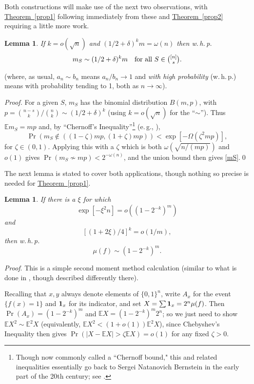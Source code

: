 \documentclass[11pt]{article}
\numberwithin{equation}{section}
\newtheorem{lemma}[theorem]{Lemma}
\theoremstyle{definition}
\theoremstyle{plain}
\newcommand{\eg}{e.\,g.}
\newcommand{\expref}[2]{\hyperref[#2]{#1~\ref{#2}}}
\newcommand{\one}[0]{{\bf 1}}
\newcommand{\beq}[1]{\begin{equation}\label{#1}}
\newcommand{\enq}[0]{\end{equation}}
\newcommand{\mn}[0]{\medskip\noindent}
\newcommand{\nin}[0]{\noindent}
\newcommand{\ra}[0]{\rightarrow}
\newcommand{\0}[0]{\emptyset}
\newcommand{\Cc}[0]{\tbinom}
\newcommand{\gd}[0]{\delta }
\newcommand{\go}[0]{\omega}
\newcommand{\gO}[0]{\Omega}
\newcommand{\gz}[0]{\zeta}
\begin{document}
Both constructions will make use of the next two
observations, with \expref{Theorem}{prop1}
following immediately from these and
\expref{Theorem}{prop2} requiring a little more work.
\begin{lemma}\label{mSlemma}
If $k=o(\sqrt{n})$ and $(1/2+\gd)^km=\go(n)$ then
w.\,h.\,p.
\beq{mS}
%
%
%
%
%
%
%
m_S \sim (1/2+\gd)^km ~~ \text{ for all } S\in \Cc{[n]}{s}. %
%
\enq
\end{lemma}
\nin
(where, as usual, $a_n\sim b_n$ means $a_n/b_n\ra 1 $
and
\emph{with high probability} (w.\,h.\,p.) means
with probability tending to 1, both as $n\ra\infty$).


\mn
\emph{Proof.}
For a given $S$, $m_S$ has the binomial distribution
$B(m,p)$, with $p = \binom{n-s}{k}/\binom{n}{k}\sim(1/2+\gd)^k$
(using $k=o(\sqrt{n})$ for the ``$\sim $'').
Thus
$\mathbb E  m_S=mp$ and,
by ``Chernoff's Inequality''\footnote{Though now commonly called a ``Chernoff bound," this and related inequalities essentially go back to
 Sergei Natanovich  %
Bernstein in the early
part of the 20th century; see \cite{Wiki}.}
%
%
%
%
%
%
(\eg, \cite[Theorem 2.1]{JLR}),
\begin{equation}   \label{eq:chernoff}
\Pr(m_S\not\in ((1-\gz)mp,(1+\gz)mp)) < \exp [-\gO(\gz^2mp)],
\end{equation}
for $\gz\in (0,1)$.
Applying this with a $\gz$ which is both
$\go(\sqrt{n/(mp)})$ and $o(1)$ gives
$\Pr(m_S\not\sim mp )< 2^{-\go(n)}$,
and the union bound then gives \eqref{mS}.\qed


\medskip
The next lemma is stated to cover
both applications, though nothing so precise
is needed for \expref{Theorem}{prop1}.

\begin{lemma}\label{muflemma}
If there is a $\xi$ for which
\beq{xi1}
\exp[-\xi^2n] = o((1-2^{-k})^m)
\enq
and
\beq{xi2}
[(1+2\xi)/4]^k=o(1/m),
\enq
then
w.\,h.\,p.
\beq{muf}
\mu(f) \sim (1-2^{-k})^m.
\enq
\end{lemma}


\mn
\emph{Proof}.
This is a simple second moment method calculation
(similar to %
what is %
done in \cite{AL}, though described
differently there).


Recalling that $x,y$ always denote elements of $\{0,1\}^n$,
write $A_x$ for the event $\{f(x)=1\}$ and $\one_x$
for its indicator,
and set $X=\sum \one_x=2^n\mu(f) $.
Then
$\Pr(A_x)= (1-2^{-k})^m$ and
$\mathbb E  X = (1-2^{-k})^m2^n$; so we just need to show
$
\mathbb E  X^2\sim \mathbb E ^2 X
$ 
(equivalently, $\mathbb E  X^2<(1+o(1))\mathbb E ^2 X$),
since Chebyshev's Inequality then gives
$\Pr(|X-\mathbb E  X|> \gz\mathbb E  X) =o(1)$
for any fixed $\gz>0$.
\end{document}

